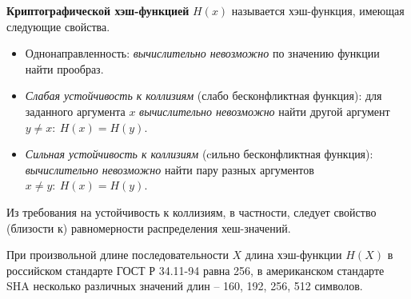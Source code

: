 \textbf{Криптографической хэш-функцией} $H(x)$ называется хэш-функция, имеющая следующие свойства.
\begin{itemize}
    \item Однонаправленность: \emph{вычислительно невозможно} по значению функции найти прообраз.
    \item \emph{Слабая устойчивость к коллизиям} (слабо бесконфликтная функция): для заданного аргумента $x$ \emph{вычислительно невозможно} найти другой аргумент $y \neq x: ~ H(x) = H(y)$.
    \item \emph{Сильная устойчивость к коллизиям} (cильно бесконфликтная функция): \emph{вычислительно невозможно} найти пару разных аргументов $x \neq y: ~ H(x) = H(y)$.
\end{itemize}

Из требования на устойчивость к коллизиям, в частности, следует свойство (близости к) равномерности распределения хеш-значений.

При произвольной длине последовательности $X$ длина хэш-функции $H(X)$ в российском стандарте ГОСТ Р 34.11-94 равна 256, в американском стандарте SHA несколько различных значений длин -- 160, 192, 256, 512 символов.

